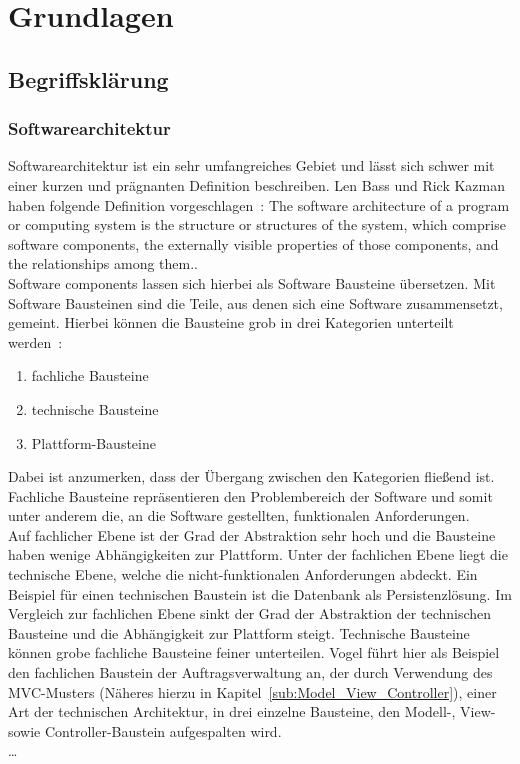 %
\chapter{Grundlagen}
\section{Begriffsklärung} %
\label{sec:Begriffsklärung}

\subsection{Softwarearchitektur} %
\label{sub:Software_Architektur}
Softwarearchitektur ist ein sehr umfangreiches Gebiet und lässt sich schwer mit einer kurzen und prägnanten Definition beschreiben.
Len Bass und Rick Kazman haben folgende Definition vorgeschlagen~\cite{softArchInPractice}:
\glqq{}The software architecture of a program or computing system is the structure or structures of the system, which comprise software components, the externally visible properties of those components, and the relationships among them.\grqq{}.~\cite{softArchGrundl}\\
\glq{}Software components\grq{} lassen sich hierbei als Software Bausteine übersetzen.
Mit Software Bausteinen sind die Teile, aus denen sich eine Software zusammensetzt, gemeint.
Hierbei können die Bausteine grob in drei Kategorien unterteilt werden~\cite{softArchGrundl}:
\begin{enumerate}
    \item fachliche Bausteine
    \item technische Bausteine
    \item Plattform-Bausteine
\end{enumerate}

Dabei ist anzumerken, dass der Übergang zwischen den Kategorien fließend ist.\\
Fachliche Bausteine repräsentieren den Problembereich der Software und somit unter anderem die, an die Software gestellten, funktionalen Anforderungen.~\cite{softArchGrundl}\\

Auf fachlicher Ebene ist der Grad der Abstraktion sehr hoch und die Bausteine haben wenige Abhängigkeiten zur Plattform.
Unter der fachlichen Ebene liegt die technische Ebene, welche die nicht-funktionalen Anforderungen abdeckt.
Ein Beispiel für einen technischen Baustein ist die Datenbank als Persistenzlösung.
Im Vergleich zur fachlichen Ebene sinkt der Grad der Abstraktion der technischen Bausteine und die Abhängigkeit zur Plattform steigt.
Technische Bausteine können grobe fachliche Bausteine feiner unterteilen.
Vogel führt hier als Beispiel den fachlichen Baustein der Auftragsverwaltung an, der durch Verwendung des MVC-Musters (Näheres hierzu in Kapitel~\ref{sub:Model_View_Controller}), einer Art der technischen Architektur, in drei einzelne Bausteine, den Modell-, View- sowie Controller-Baustein aufgespalten wird.\\
\dots

